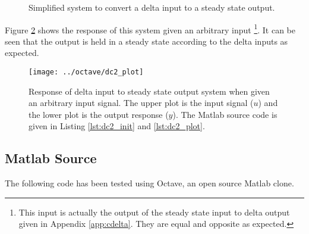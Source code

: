 \documentclass{article}
\begin{document}
\begin{figure}[!htbp]
\begin{center}


\end{center}
\caption{Simplified system to convert a delta input to
a steady state output.}
\label{fig:dc1s}
\end{figure}

Figure \ref{fig:dc2_plot} shows the response of this system given
an arbitrary input
\footnote{This input is actually the output of the steady state input
to delta output given in Appendix \ref{app:cdelta}.
They are equal and opposite as expected.}.
It can be seen that the output is held in a steady state according
to the delta inputs as expected.

\begin{figure}[htbp!]
\texttt{[image: ../octave/dc2\_plot]}
\caption{Response of delta input to steady state output system
when given an arbitrary input signal.
The upper plot is the input signal ($u$) and the lower plot is
the output response ($y$).
The Matlab source code is given in Listing \ref{lst:dc2_init}
and \ref{lst:dc2_plot}.
}
\label{fig:dc2_plot}
\end{figure}

\clearpage
\subsection{Matlab Source}
\label{app:dcsrc}

The following code has been tested using Octave\autocite{octave},
an open source Matlab clone.

%
%
%




\end{document}
